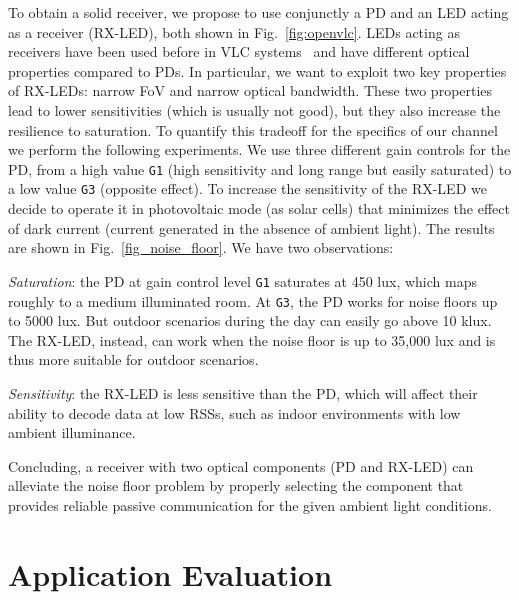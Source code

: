 \documentclass[10pt]{sig-alternate-05-2015}
\begin{document}
To obtain a solid receiver, we propose to use conjunctly a PD and an LED acting as a receiver (RX-LED), both shown in Fig.~\ref{fig:openvlc}. LEDs acting as receivers have been used before in VLC systems~\cite{Dietz,giustiniano_wd,Schmid2013,Wang2015HotWireless} and have different optical properties compared to PDs. In particular, we want to exploit two key properties of RX-LEDs: narrow FoV and narrow optical bandwidth. These two properties lead to lower sensitivities (which is usually not good), but they also increase the resilience to saturation. To quantify this tradeoff for the specifics of our channel we perform the following experiments. We use three different gain controls for the PD, from a high value {\tt G1} (high sensitivity and long range but easily saturated) to a low value {\tt G3} (opposite effect). To increase the sensitivity of the RX-LED we decide to operate it in photovoltaic mode (as solar cells) that minimizes the effect of dark current (current generated in the absence of ambient light). The results are shown in Fig.~\ref{fig_noise_floor}. We have two observations:

\textit{Saturation}: the PD at gain control level {\tt G1} saturates at 450 lux, which maps roughly to a medium illuminated room. At {\tt G3}, the PD works for noise floors up to 5000 lux. But outdoor scenarios during the day can easily go above 10 klux. The RX-LED, instead, can work when the noise floor is up to 35,000 lux and is thus more suitable for outdoor scenarios.

\textit{Sensitivity}: the RX-LED is less sensitive than the PD, which will affect their ability to decode data at low RSSs, such as indoor environments with low ambient illuminance. 

Concluding, a receiver with two optical components (PD and RX-LED) can alleviate the noise floor problem by properly selecting the component that provides reliable passive communication for the given ambient light conditions. 


\section{Application Evaluation} \label{sec_app}
\end{document}
